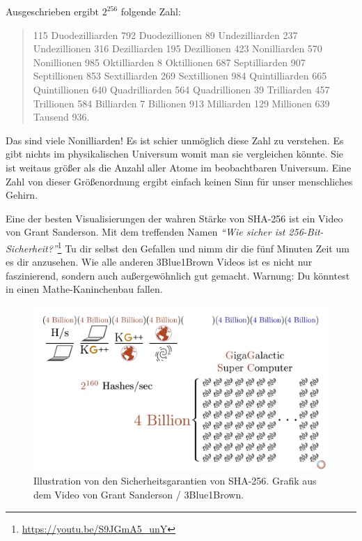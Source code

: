 Ausgeschrieben ergibt $2^{256}$ folgende Zahl:

\begin{quotation}\begin{samepage}
    115 Duodezilliarden 792 Duodezillionen 89 Undezilliarden 237 Undezillionen
    316 Dezilliarden 195 Dezillionen 423 Nonilliarden 570 Nonillionen 985
    Oktilliarden 8 Oktillionen 687 Septilliarden 907 Septillionen 853
    Sextilliarden 269 Sextillionen 984 Quintilliarden 665 Quintillionen 640
    Quadrilliarden 564 Quadrillionen 39 Trilliarden 457 Trillionen 584
    Billiarden 7 Billionen 913 Milliarden 129 Millionen 639 Tausend 936.
\end{samepage}\end{quotation}

Das sind viele Nonilliarden! Es ist schier unmöglich diese Zahl zu verstehen. Es
gibt nichts im physikalischen Universum womit man sie vergleichen könnte. Sie
ist weitaus größer als die Anzahl aller Atome im beobachtbaren Universum. Eine
Zahl von dieser Größenordnung ergibt einfach keinen Sinn für unser menschliches
Gehirn.

Eine der besten Visualisierungen der wahren Stärke von SHA-256 ist ein  Video
von Grant Sanderson. Mit dem treffenden Namen \textit{\enquote{Wie sicher ist
256-Bit-Sicherheit?}}\footnote{\url{https://youtu.be/S9JGmA5_unY}} Tu dir selbst
den Gefallen und nimm dir die fünf Minuten Zeit um es dir anzusehen. Wie alle
anderen 3Blue1Brown Videos ist es nicht nur faszinierend, sondern auch
außergewöhnlich gut gemacht. Warnung: Du könntest in einen Mathe-Kaninchenbau
fallen.

\begin{figure}
  \includegraphics[width=\textwidth]{assets/images/youtube-vid-inverted.png}
  \caption{Illustration von den Sicherheitsgarantien von SHA-256. Grafik aus dem Video von Grant Sanderson / 3Blue1Brown.}
  \label{fig:youtube-vid-inverted}
\end{figure}

